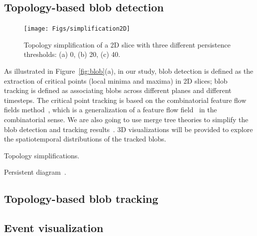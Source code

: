\subsection{Topology-based blob detection}


\begin{figure}[!h]
  \centering
  \texttt{[image: Figs/simplification2D]}
  \caption{Topology simplification of a 2D slice with three different persistence thresholds: (a) 0, (b) 20, (c) 40.}
\end{figure}


As illustrated in Figure~\ref{fig:blob}(a), in our study, blob detection is defined as the extraction of critical points (local minima and maxima) in 2D slices; blob tracking is defined as associating blobs across different planes and different timesteps.  The critical point tracking is based on the combinatorial feature flow fields method~\cite{ReininghausKWH12}, which is a generalization of a feature flow field~\cite{TheiselS03} in the combinatorial sense.  We are also going to use merge tree theories to simplify the blob detection and tracking results~\cite{OesterlingHWMS17}.  3D visualizations will be provided to explore the spatiotemporal distributions of the tracked blobs.  

Topology simplifications.  

Persistent diagram~\cite{EdelsbrunnerLZ02}.  



\subsection{Topology-based blob tracking}



\subsection{Event visualization}

